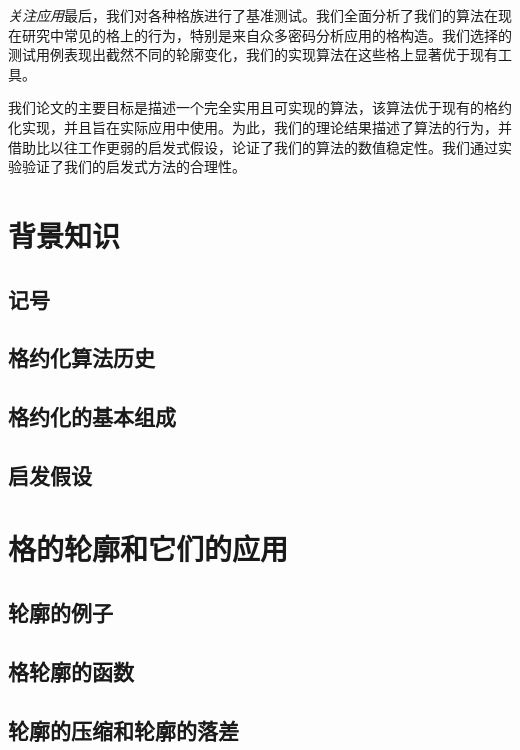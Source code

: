 \documentclass[UTF8]{ctexart}
\begin{document}
    \emph{关注应用}\quad 最后，我们对各种格族进行了基准测试。我们全面分析了我们的算法在现在研究中常见的格上的行为，特别是来自众多密码分析应用的格构造。我们选择的测试用例表现出截然不同的轮廓变化，我们的实现算法在这些格上显著优于现有工具。

    我们论文的主要目标是描述一个完全实用且可实现的算法，该算法优于现有的格约化实现，并且旨在实际应用中使用。为此，我们的理论结果描述了算法的行为，并借助比以往工作更弱的启发式假设，论证了我们的算法的数值稳定性。我们通过实验验证了我们的启发式方法的合理性。


\iffalse
\section{背景知识}

    \subsection{记号}

    \subsection{格约化算法历史}

    \subsection{格约化的基本组成}

    \subsection{启发假设}

\section{格的轮廓和它们的应用}

    \subsection{轮廓的例子}

    \subsection{格轮廓的函数}

    \subsection{轮廓的压缩和轮廓的落差}
\end{document}
